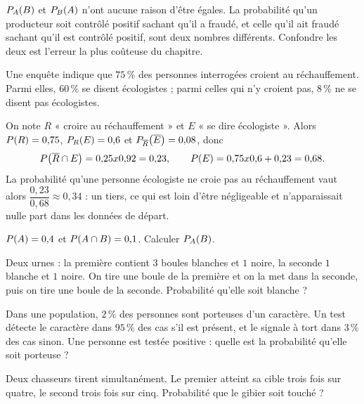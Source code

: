 \begin{avertissement}
$\probacond{B}{A}$ et $\probacond{A}{B}$ n'ont aucune raison d'être égales.
La probabilité qu'un producteur soit contrôlé positif sachant qu'il a fraudé,
et celle qu'il ait fraudé sachant qu'il est contrôlé positif, sont deux
nombres différents. Confondre les deux est l'erreur la plus coûteuse du
chapitre.
\end{avertissement}

\begin{exemple}
Une enquête indique que $75\,\%$ des personnes interrogées croient au
réchauffement. Parmi elles, $60\,\%$ se disent écologistes ; parmi celles qui
n'y croient pas, $8\,\%$ ne se disent pas écologistes.

On note $R$ « croire au réchauffement » et $E$ « se dire écologiste ». Alors
$\proba{R} = 0{,}75$, $\probacond{E}{R} = 0{,}6$ et
$\probacond{\evtc{E}}{\evtc{R}} = 0{,}08$, donc
\[
  \proba{\evtc{R} \cap E} = 0{,}25 \times 0{,}92 = 0{,}23,
  \qquad
  \proba{E} = 0{,}75 \times 0{,}6+0{,}23 = 0{,}68 .
\]
La probabilité qu'une personne écologiste ne croie pas au réchauffement vaut
alors $\dfrac{0{,}23}{0{,}68} \approx 0{,}34$ : un tiers, ce qui est loin
d'être négligeable et n'apparaissait nulle part dans les données de départ.
\end{exemple}

\begin{entrainement}[conditionnement]
\exo[\niveau{1}] $\proba{A} = 0{,}4$ et $\proba{A \cap B} = 0{,}1$.
Calculer $\probacond{B}{A}$.

\exo[\niveau{2}] Deux urnes : la première contient $3$ boules blanches et $1$
noire, la seconde $1$ blanche et $1$ noire. On tire une boule de la première
et on la met dans la seconde, puis on tire une boule de la seconde.
Probabilité qu'elle soit blanche ?

\exo[\niveau{2}] Dans une population, $2\,\%$ des personnes sont porteuses
d'un caractère. Un test détecte le caractère dans $95\,\%$ des cas s'il est
présent, et le signale à tort dans $3\,\%$ des cas sinon. Une personne est
testée positive : quelle est la probabilité qu'elle soit porteuse ?

\exo[\niveau{3}] Deux chasseurs tirent simultanément. Le premier atteint sa
cible trois fois sur quatre, le second trois fois sur cinq. Probabilité que le
gibier soit touché ?
\end{entrainement}

